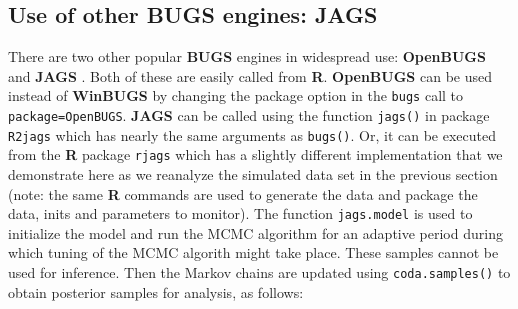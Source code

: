 \subsection{Use of other BUGS engines: JAGS}

There are two other popular {\bf BUGS} engines in widespread use: {\bf
  OpenBUGS} \citep{thomas_etal:2006} and {\bf JAGS}
\citep{plummer:2003}. Both of these are easily called from {\bf
  R}. {\bf OpenBUGS} can be used instead of {\bf WinBUGS} by changing
the package option in the \mbox{\tt bugs} call to \mbox{\tt
  package=OpenBUGS}.  {\bf JAGS} can be called using the function
\mbox{\tt jags()} in package \mbox{\tt R2jags} which has nearly the
same arguments as \mbox{\tt bugs()}.  Or, it can be executed from 
the {\bf R}
package
 \mbox{\tt rjags} \citep{plummer:2009} which has a slightly
different implementation that we demonstrate here as we reanalyze the
simulated data set in the previous section (note: the same {\bf R}
commands are used to generate the data and package the data, inits and
parameters to monitor). The function \mbox{\tt jags.model} is used to
initialize the model and run the MCMC algorithm for an adaptive period
during which tuning of the MCMC algorith might take place.  These
samples cannot be used for inference.  Then the Markov chains are
updated using \mbox{\tt coda.samples()} to obtain posterior samples
for analysis, as follows:
